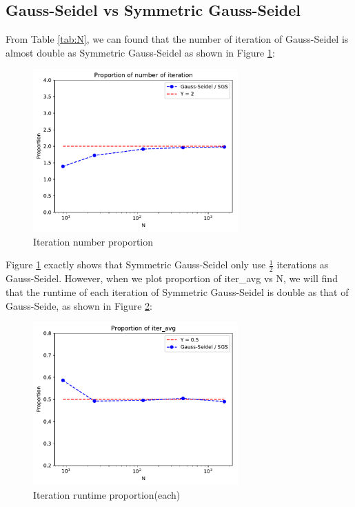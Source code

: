\documentclass{article}
\begin{document}
\subsection{Gauss-Seidel vs Symmetric Gauss-Seidel}
\label{sec:gauss vs sgs}
From Table \ref{tab:N}, we can found that the number of iteration of Gauss-Seidel is almost double as Symmetric Gauss-Seidel 
as shown in Figure \ref{fig:gauss vs sgs iter}:
\begin{figure}[H]
    \centering
    \includegraphics[width=0.7\textwidth]{src/gauss_sgs_iter.pdf}
    \caption{Iteration number proportion}
    \label{fig:gauss vs sgs iter}
\end{figure}
Figure \ref{fig:gauss vs sgs iter} exactly shows that Symmetric Gauss-Seidel only use $\frac{1}{2}$ iterations as Gauss-Seidel.
However, when we plot proportion of iter\_avg vs N, we will find that the runtime of each iteration of Symmetric Gauss-Seidel is
double as that of Gauss-Seide, as shown in Figure \ref{fig:gauss vs sgs avg}:
\begin{figure}[H]
    \centering
    \includegraphics[width=0.7\textwidth]{src/gauss_sgs_avg.pdf}
    \caption{Iteration runtime proportion(each)}
    \label{fig:gauss vs sgs avg}
\end{figure}
\end{document}
